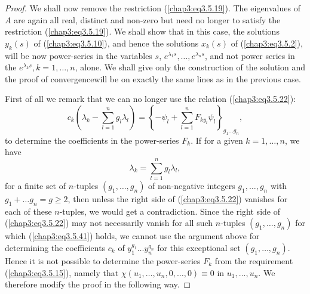 \begin{proof}
We shall now remove the restriction (\ref{chap3:eq3.5.19}). The
eigenvalues of $A$ are again all real, distinct and non-zero but need
no longer to satisfy the restriction (\ref{chap3:eq3.5.19}). We shall
show that in this case, the solutions $y_k(s)$ of
(\ref{chap3:eq3.5.10}), and hence the solutions $x_k(s)$ of
(\ref{chap3:eq3.5.2}), will be now power-series in the variables $s$,
$e^{\lambda_1 s}, \ldots, e^{\lambda_ns}$, and not power series in the
$e^{\lambda_ks} , k =1, \ldots, n$, alone. We shall give only the
construction of the solution and the proof of
convergence\pageoriginale will be on exactly the same lines as in the
previous case. 

First of all we remark that we can no longer use the relation
(\ref{chap3:eq3.5.22}): 
$$
c_k \left(\lambda_k - \sum\limits^n_{l=1} g_l \lambda_l \right) =
\left\{ -\psi_l + \sum\limits^n_{l=1} F_{ky_l} \psi_l\right\}_{g_1
  \ldots g_n}, 
$$
to determine the coefficients in the power-series $F_k$. If for a
given $k=1, \ldots, n$, we have  
\begin{equation*}
\lambda_k = \sum\limits^n_{l=1} g_l \lambda_l,
\tag{3.5.41}\label{chap3:eq3.5.41} 
\end{equation*}
for a finite set of $n$-tuples $(g_1, \ldots, g_n)$ of non-negative
integers $g_1, \ldots, g_n$ with $g_1 + \ldots g_n = g \geq 2$, then
unless the right side of (\ref{chap3:eq3.5.22}) vanishes for each of
these $n$-tuples, we would get a contradiction. Since the right side
of (\ref{chap3:eq3.5.22}) may not necessarily vanish for all such
$n$-tuples $(g_1, \ldots, g_n)$ for which (\ref{chap3:eq3.5.41})
holds, we cannot use the argument above for determining the
coefficients $c_k$ of $y^{g_1}_1 \ldots y^{g_n}_n$ for this
exceptional set $(g_1, \ldots, g_n)$. Hence it is not possible to
determine the power-series $F_k$ from the requirement
(\ref{chap3:eq3.5.15}), namely that $\chi (u_1, \ldots, u_n, 0,
\ldots, 0) \equiv 0$ in $u_1, \ldots, u_n$. We therefore modify the
proof in the following way. 


\end{proof}
